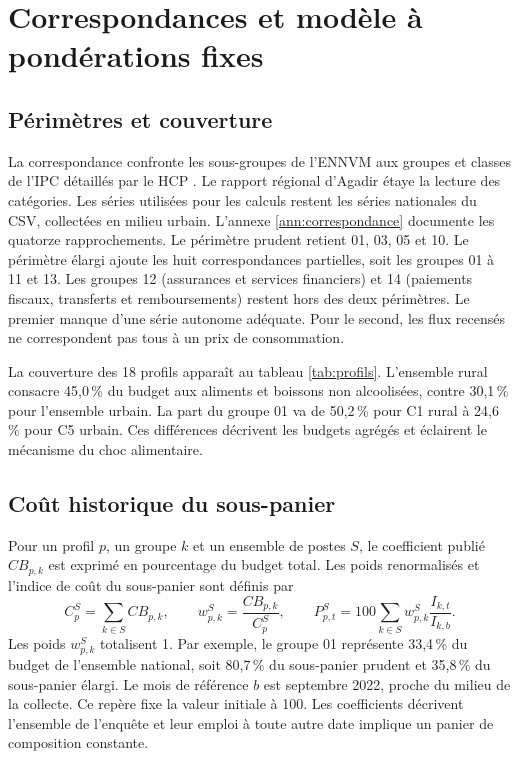\chapter{Correspondances et modèle à pondérations fixes}
\section{Périmètres et couverture}
La correspondance confronte les sous-groupes de l'ENNVM aux groupes et classes de l'IPC détaillés par le HCP \cite{hcpIPC,hcpAgadir}. Le rapport régional d'Agadir étaye la lecture des catégories. Les séries utilisées pour les calculs restent les séries nationales du CSV, collectées en milieu urbain. L'annexe \ref{ann:correspondance} documente les quatorze rapprochements. Le périmètre prudent retient 01, 03, 05 et 10. Le périmètre élargi ajoute les huit correspondances partielles, soit les groupes 01 à 11 et 13. Les groupes 12 (assurances et services financiers) et 14 (paiements fiscaux, transferts et remboursements) restent hors des deux périmètres. Le premier manque d'une série autonome adéquate. Pour le second, les flux recensés ne correspondent pas tous à un prix de consommation.

La couverture des 18 profils apparaît au tableau \ref{tab:profils}. L'ensemble rural consacre 45,0\,\% du budget aux aliments et boissons non alcoolisées, contre 30,1\,\% pour l'ensemble urbain. La part du groupe 01 va de 50,2\,\% pour C1 rural à 24,6\,\% pour C5 urbain. Ces différences décrivent les budgets agrégés et éclairent le mécanisme du choc alimentaire.


\section{Coût historique du sous-panier}
Pour un profil $p$, un groupe $k$ et un ensemble de postes $S$, le coefficient publié $CB_{p,k}$ est exprimé en pourcentage du budget total. Les poids renormalisés et l'indice de coût du sous-panier sont définis par
\[
 C_p^S=\sum_{k\in S}CB_{p,k},\qquad w_{p,k}^S=\frac{CB_{p,k}}{C_p^S},\qquad
 P_{p,t}^S=100\sum_{k\in S}w_{p,k}^S\frac{I_{k,t}}{I_{k,b}} .
\]
Les poids $w_{p,k}^S$ totalisent 1. Par exemple, le groupe 01 représente 33,4\,\% du budget de l'ensemble national, soit 80,7\,\% du sous-panier prudent et 35,8\,\% du sous-panier élargi. Le mois de référence $b$ est septembre 2022, proche du milieu de la collecte. Ce repère fixe la valeur initiale à 100. Les coefficients décrivent l'ensemble de l'enquête et leur emploi à toute autre date implique un panier de composition constante.

